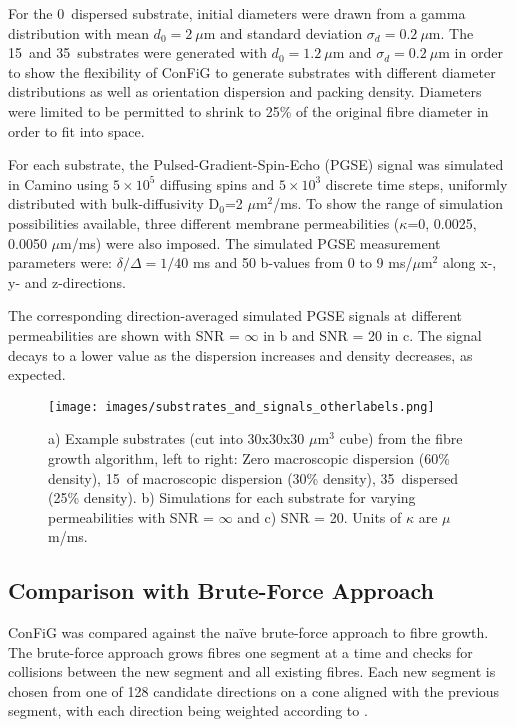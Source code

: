For the 0\degree\ dispersed substrate, initial diameters were drawn from a gamma distribution with mean $d_0 = 2\ \mu$m and standard deviation $\sigma_d = 0.2\ \mu$m. The 15\degree\ and 35\degree\ substrates were generated with $d_0 = 1.2\ \mu$m and $\sigma_d = 0.2\ \mu$m in order to show the flexibility of ConFiG to generate substrates with different diameter distributions as well as orientation dispersion and packing density. Diameters were limited to be permitted to shrink to 25\% of the original fibre diameter in order to fit into space.

For each substrate, the Pulsed-Gradient-Spin-Echo (PGSE) signal was simulated in Camino\cite{Cook2006} using $5\times 10^5$ diffusing spins and $5\times 10^3$ discrete time steps, uniformly distributed with bulk-diffusivity D$_0$=2 $\mu$m$^2$/ms. To show the range of simulation possibilities available, three different membrane permeabilities ($\kappa$=0, 0.0025, 0.0050 $\mu$m/ms) were also imposed.
The simulated PGSE measurement parameters were: $\delta/\Delta=1/40$ ms and 50 b-values from 0 to 9 ms/$\mu$m$^2$ along x-, y- and z-directions.

The corresponding direction-averaged simulated PGSE signals at different permeabilities are shown with SNR = $\infty$ in b and SNR = 20 in c.
The signal decays to a lower value as the dispersion increases and density decreases, as expected.

\begin{figure}[h!]
  \centering
  \texttt{[image: images/substrates\_and\_signals\_otherlabels.png]}
  \caption{\small a) Example substrates (cut into 30x30x30 $\mu$m$^3$ cube) from the fibre growth algorithm, left to right:  Zero macroscopic dispersion (60\% density), 15\degree\ of macroscopic dispersion (30\% density), 35\degree\ dispersed (25\% density). b) Simulations for each substrate for varying permeabilities with SNR = $\infty$  and c) SNR = 20. Units of $\kappa$ are $\mu$m/ms.}
  \label{fig:substrates}
\end{figure}

\subsection{Comparison with Brute-Force Approach}
\label{sec:method_bruteforce}
ConFiG was compared against the na\"ive brute-force approach to fibre growth.
The brute-force approach grows fibres one segment at a time and checks for collisions between the new segment and all existing fibres.
Each new segment is chosen from one of 128 candidate directions on a cone aligned with the previous segment, with each direction being weighted according to .

